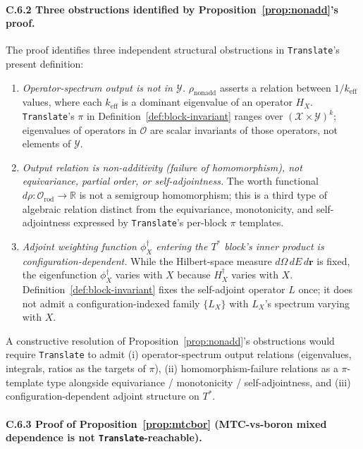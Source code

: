\documentclass[manuscript]{acmart}
\begin{document}
\paragraph{C.6.2 Three obstructions identified by Proposition~\ref{prop:nonadd}'s proof.}
The proof identifies three independent structural obstructions in \texttt{Translate}'s present definition:
\begin{enumerate}[leftmargin=*,nosep]
  \item[(O1)] \emph{Operator-spectrum output is not in $\mathcal{Y}$.} $\rho_{\mathrm{nonadd}}$ asserts a relation between $1/k_{\mathrm{eff}}$ values, where each $k_{\mathrm{eff}}$ is a dominant eigenvalue of an operator $H_{X}$. \texttt{Translate}'s $\pi$ in Definition~\ref{def:block-invariant} ranges over $(\mathcal{X} \times \mathcal{Y})^{k}$; eigenvalues of operators in $\mathcal{O}$ are scalar invariants of those operators, not elements of $\mathcal{Y}$.
  \item[(O2)] \emph{Output relation is non-additivity (failure of homomorphism), not equivariance, partial order, or self-adjointness.} The worth functional $d\rho: \mathcal{O}_{\mathrm{rod}} \to \mathbb{R}$ is not a semigroup homomorphism; this is a third type of algebraic relation distinct from the equivariance, monotonicity, and self-adjointness expressed by \texttt{Translate}'s per-block $\pi$ templates.
  \item[(O3)] \emph{Adjoint weighting function $\phi^{\dagger}_{X}$ entering the $T^{*}$ block's inner product is configuration-dependent.} While the Hilbert-space measure $d\Omega\, dE\, d\mathbf{r}$ is fixed, the eigenfunction $\phi^{\dagger}_{X}$ varies with $X$ because $H^{\dagger}_{X}$ varies with $X$. Definition~\ref{def:block-invariant} fixes the self-adjoint operator $L$ once; it does not admit a configuration-indexed family $\{L_{X}\}$ with $L_{X}$'s spectrum varying with $X$.
\end{enumerate}

A constructive resolution of Proposition~\ref{prop:nonadd}'s obstructions would require \texttt{Translate} to admit (i) operator-spectrum output relations (eigenvalues, integrals, ratios as the targets of $\pi$), (ii) homomorphism-failure relations as a $\pi$-template type alongside equivariance / monotonicity / self-adjointness, and (iii) configuration-dependent adjoint structure on $T^{*}$.

\paragraph{C.6.3 Proof of Proposition~\ref{prop:mtcbor} (MTC-vs-boron mixed dependence is not \texttt{Translate}-reachable).}
\end{document}

